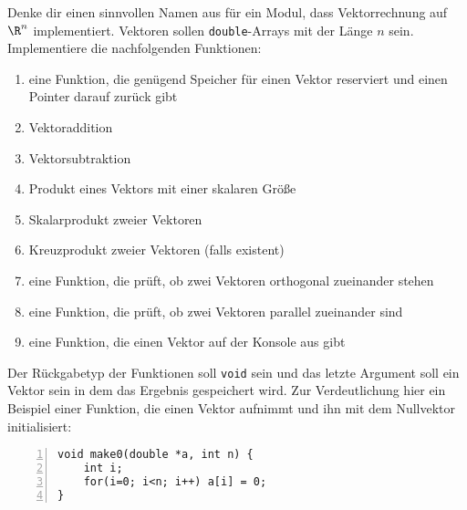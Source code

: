 \begin{aufg}
Denke dir einen sinnvollen Namen aus für ein Modul, dass Vektorrechnung auf $\R^n$ implementiert. Vektoren sollen \verb|double|-Arrays mit der Länge $n$ sein. Implementiere die nachfolgenden Funktionen:
\begin{enumerate}
	\item eine Funktion, die genügend Speicher für einen Vektor reserviert und einen Pointer darauf zurück gibt
	\item Vektoraddition
	\item Vektorsubtraktion
	\item Produkt eines Vektors mit einer skalaren Größe
	\item Skalarprodukt zweier Vektoren
	\item Kreuzprodukt zweier Vektoren (falls existent)
	\item eine Funktion, die prüft, ob zwei Vektoren orthogonal zueinander stehen
	\item eine Funktion, die prüft, ob zwei Vektoren parallel zueinander sind
	\item eine Funktion, die einen Vektor auf der Konsole aus gibt
\end{enumerate}
Der Rückgabetyp der Funktionen soll \verb|void| sein und das letzte Argument soll ein Vektor sein in dem das Ergebnis gespeichert wird. Zur Verdeutlichung hier ein Beispiel einer Funktion, die einen Vektor aufnimmt und ihn mit dem Nullvektor initialisiert:
\begin{codelisting}
\begin{lstlisting}[numbers=left,numberstyle=\tiny,frame=tlrb]
void make0(double *a, int n) { 
	int i;
	for(i=0; i<n; i++) a[i] = 0;
}
\end{lstlisting}
\end{codelisting}
\end{aufg}